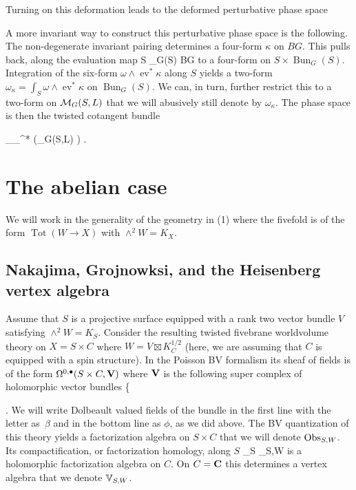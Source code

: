 \documentclass[11pt]{amsart}
\renewcommand{\op}{\operatorname}
\begin{document}
Turning on this deformation leads to the deformed perturbative phase space
\beqn
{}
\eeqn
A more invariant way to construct this perturbative phase space is the following.
The non-degenerate invariant pairing determines a four-form $\kappa$ on $BG$.
This pulls back, along the evaluation map
\beqn
\op{ev} \colon S \times \op{Bun}_G(S) \to BG 
\eeqn
to a four-form on $S \times \op{Bun}_G(S)$.
Integration of the six-form $\omega \wedge \op{ev}^*\kappa$ along $S$ yields a two-form $\omega_{\kappa} = \int_S \omega \wedge \op{ev}^*\kappa$ on $\op{Bun}_G(S)$.
We can, in turn, further restrict this to a two-form on $\mathcal M_{G}(S,L)$ that we will abusively still denote by $\omega_{\kappa}$.
The phase space is then the twisted cotangent bundle

\beqn\label{eqn:5dphase}
\T_{\omega_{\kappa}}^* \left(\cM_{G}(S,L) \right) .
\eeqn

\section{The abelian case}

We will work in the generality of the geometry in (1) where the fivefold is of the form $\op{Tot}(W \to X)$ with $\wedge^2 W = K_X$.

\subsection{Nakajima, Grojnowksi, and the Heisenberg vertex algebra}

Assume that $S$ is a projective surface equipped with a rank two vector bundle $V$ satisfying $\wedge^2 W = K_S$.
Consider the resulting twisted fivebrane worldvolume theory on $X = S \times C$ where $W = V \boxtimes K_C^{1/2}$ (here, we are assuming that $C$ is equipped with a spin structure).
In the Poisson BV formalism its sheaf of fields is of the form $\Omega^{0,\bullet}(S \times C,\mathbf V)$ where $\mathbf V$ is the following super complex of holomorphic vector bundles
\beqn
\bV \colon \;\;\;\left\{
 \right.
\eeqn
We will write Dolbeault valued fields of the bundle in the first line with the letter as~$\beta$ and in the bottom line as $\phi$, as we did above.
The BV quantization of this theory yields a factorization algebra on $S \times C$ that we will denote ${\rm Obs}_{S,W}$.
Its compactification, or factorization homology, along $S$
\beqn
\int_S \Obs_{S,W} 
\eeqn
is a holomorphic factorization algebra on $C$.
On $C = \mathbf{C}$ this determines a vertex algebra that we denote $\mathbb V_{S,W}$.
\end{document}
